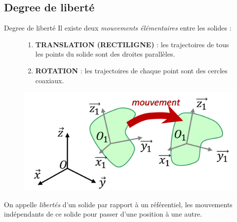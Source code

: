 \documentclass[
  ignorenonframetext,
  aspectratio=169,
  c]{beamer}
\providecommand{\tightlist}{%
  \setlength{\itemsep}{0pt}\setlength{\parskip}{0pt}}\usepackage{longtable,booktabs,array}
\begin{document}
\subsection{Degree de liberté}\label{degree-de-libertuxe9}

\begin{frame}{Degree de liberté}
Il existe deux \emph{mouvements élémentaires} entre les solides :

\begin{figure}

\begin{minipage}{0.55\linewidth}

\begin{enumerate}
\tightlist
\item
  \textbf{TRANSLATION (RECTILIGNE)} : les trajectoires de tous les
  points du solide sont des droites parallèles.
\item
  \textbf{ROTATION} : les trajectoires de chaque point sont des cercles
  coaxiaux.
\end{enumerate}

\end{minipage}%
%
\begin{minipage}{0.46\linewidth}
\begin{center}
\includegraphics[width=1\textwidth,height=\textheight]{CM3/Repere-02.png}
\end{center}
\end{minipage}%

\end{figure}%

On appelle \emph{libertés} d'un solide par rapport à un référentiel, les
mouvements indépendants de ce solide pour passer d'une position à une
autre.
\end{frame}
\end{document}
